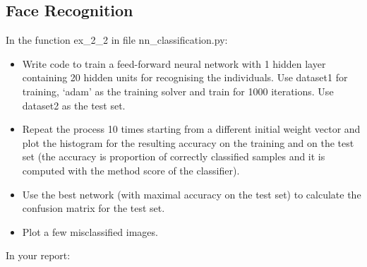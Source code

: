 \documentclass[a4paper]{article}
\begin{document}
\begin{itemize}
\begin{minipage}{0.4\textwidth}
  \label{pose_recognition_hidden_units}
\end{minipage}
\end{itemize}

\newpage

\subsection{Face Recognition}
In the function ex\_2\_2 in file nn\_classification.py:
\begin{itemize}
    \item Write code to train a feed-forward neural network with 1 hidden layer containing 20 hidden units for recognising the individuals. Use dataset1 for training, ‘adam’ as the training solver and train for 1000 iterations. Use dataset2 as the test set.
    \item Repeat the process 10 times starting from a different initial weight vector and plot the histogram for the resulting accuracy on the training and on the test set (the accuracy is proportion of correctly classified samples and it is computed with the method score of the classifier).
    \item Use the best network (with maximal accuracy on the test set) to calculate the confusion matrix for the test set.
	\item Plot a few misclassified images.
\end{itemize}
In your report:
\end{document}
